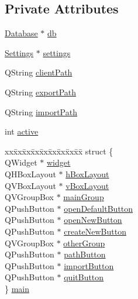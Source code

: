 \subsection*{Private Attributes}
\begin{CompactItemize}
\item 
\hyperlink{classDatabase}{Database} $\ast$ \hyperlink{classMainStack_r0}{db}
\item 
\hyperlink{classSettings}{Settings} $\ast$ \hyperlink{classMainStack_r1}{settings}
\item 
QString \hyperlink{classMainStack_r2}{client\-Path}
\item 
QString \hyperlink{classMainStack_r3}{export\-Path}
\item 
QString \hyperlink{classMainStack_r4}{import\-Path}
\item 
int \hyperlink{classMainStack_r5}{active}
\item 
\begin{tabbing}
xx\=xx\=xx\=xx\=xx\=xx\=xx\=xx\=xx\=\kill
struct \{\\
\>QWidget $\ast$ \hyperlink{classMainStack_r6}{widget}\\
\>QHBoxLayout $\ast$ \hyperlink{classMainStack_r7}{hBoxLayout}\\
\>QVBoxLayout $\ast$ \hyperlink{classMainStack_r8}{vBoxLayout}\\
\>QVGroupBox $\ast$ \hyperlink{classMainStack_r9}{mainGroup}\\
\>QPushButton $\ast$ \hyperlink{classMainStack_r10}{openDefaultButton}\\
\>QPushButton $\ast$ \hyperlink{classMainStack_r11}{openNewButton}\\
\>QPushButton $\ast$ \hyperlink{classMainStack_r12}{createNewButton}\\
\>QVGroupBox $\ast$ \hyperlink{classMainStack_r13}{otherGroup}\\
\>QPushButton $\ast$ \hyperlink{classMainStack_r14}{pathButton}\\
\>QPushButton $\ast$ \hyperlink{classMainStack_r15}{importButton}\\
\>QPushButton $\ast$ \hyperlink{classMainStack_r16}{quitButton}\\
\} \hyperlink{classMainStack_r17}{main}\\


\end{tabbing}
\end{CompactItemize}
